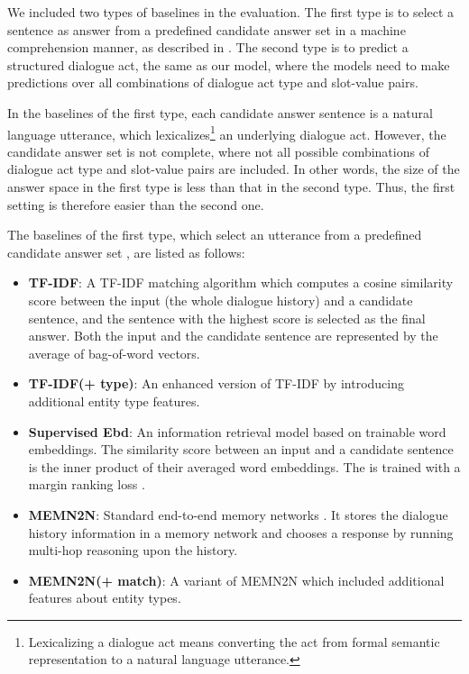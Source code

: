 We included two types of baselines in the evaluation. The first type is to select a sentence as answer from a predefined candidate answer set in a machine comprehension manner, as described in \cite{bordes2016learning}. The second type is to predict a structured dialogue act, the same as our model, where the models need to make predictions over all combinations of dialogue act type and slot-value pairs.

In the baselines of the first type, each candidate answer sentence is a natural language utterance, which lexicalizes\footnote{Lexicalizing a dialogue act means converting the act from formal semantic representation to a natural language utterance.} an underlying dialogue act. However, the candidate answer set is not complete, where not all possible combinations of dialogue act type and slot-value pairs are included. In other words, the size of the answer space in the first type is less than that in the second type. Thus, the first setting is therefore easier than the second one. 


The baselines of the first type, which select an utterance from a predefined candidate answer set \cite{bordes2016learning}, are listed as follows:
\begin{itemize}

\item {\bf TF-IDF}: A TF-IDF matching algorithm\cite{salton1986introduction} which computes a cosine similarity score between the input (the whole dialogue history) and a candidate sentence, and the sentence with the highest score is selected as the final answer. Both the input and the candidate sentence are represented by the average of bag-of-word vectors.
    
\item {\bf TF-IDF(+ type)}: An enhanced version of TF-IDF by introducing additional entity type features.

\item {\bf Supervised Ebd}: An information retrieval model based on trainable word embeddings. The similarity score between an input and a candidate sentence is the inner product of their averaged word embeddings. The  is trained with a margin ranking loss \cite{bai2009supervised}.

\item {\bf MEMN2N}: Standard end-to-end memory networks \cite{sukhbaatar2015end, bordes2016learning}. It stores the dialogue history information in a memory network and chooses a response by running multi-hop reasoning upon the history. 

\item {\bf MEMN2N(+ match)}: A variant of MEMN2N which included additional features about entity types.
\end{itemize}


